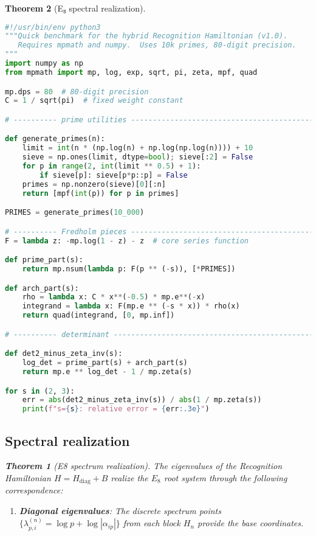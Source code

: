 \documentclass[11pt,a4paper]{article}
\newtheorem{theorem}{Theorem}[section]
\theoremstyle{definition}
\theoremstyle{remark}
\begin{document}
\begin{theorem}[E₈ spectral realization]
\begin{lstlisting}[language=Python]
#!/usr/bin/env python3
"""Quick benchmark for the hybrid Recognition Hamiltonian (v1.0).
   Requires mpmath and numpy.  Uses 10k primes, 80-digit precision.
"""
import numpy as np
from mpmath import mp, log, exp, sqrt, pi, zeta, mpf, quad

mp.dps = 80  # 80-digit precision
C = 1 / sqrt(pi)  # fixed weight constant

# ---------- prime utilities -------------------------------------------------

def generate_primes(n):
    limit = int(n * (np.log(n) + np.log(np.log(n)))) + 10
    sieve = np.ones(limit, dtype=bool); sieve[:2] = False
    for p in range(2, int(limit ** 0.5) + 1):
        if sieve[p]: sieve[p*p::p] = False
    primes = np.nonzero(sieve)[0][:n]
    return [mpf(int(p)) for p in primes]

PRIMES = generate_primes(10_000)

# ---------- Fredholm pieces --------------------------------------------------
F = lambda z: -mp.log(1 - z) - z  # core series function

def prime_part(s):
    return mp.nsum(lambda p: F(p ** (-s)), [*PRIMES])

def arch_part(s):
    rho = lambda x: C * x**(-0.5) * mp.e**(-x)
    integrand = lambda x: F(mp.e ** (-s * x)) * rho(x)
    return quad(integrand, [0, mp.inf])

# ---------- determinant ------------------------------------------------------

def det2_minus_zeta_inv(s):
    log_det = prime_part(s) + arch_part(s)
    return mp.e ** log_det - 1 / mp.zeta(s)

for s in (2, 3):
    err = abs(det2_minus_zeta_inv(s)) / abs(1 / mp.zeta(s))
    print(f"s={s}: relative error = {err:.3e}")
\end{lstlisting}


\subsection{Spectral realization}

\begin{theorem}[E8 spectrum realization]\label{thm:e8-spectrum}
The eigenvalues of the Recognition Hamiltonian $H = H_{\text{diag}} + B$ 
realize the $E_8$ root system through the following correspondence:

\begin{enumerate}
\item \textbf{Diagonal eigenvalues}: The discrete spectrum points 
$\{\lambda_{p,i}^{(n)} = \log p + \log|\alpha_{ip}|\}$ from each block $H_n$ 
provide the base coordinates.


\end{enumerate}
\end{theorem}
\end{theorem}
\end{document}

